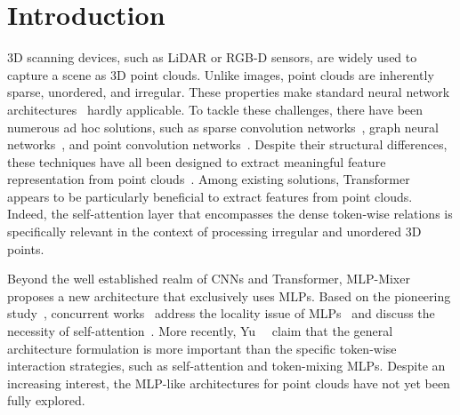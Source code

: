 \section{Introduction}
\label{sec:Introduction}
3D scanning devices, such as LiDAR or RGB-D sensors, are widely used to capture a scene as 3D point clouds. Unlike images, point clouds are inherently sparse, unordered, and irregular. These properties make standard neural network architectures~\cite{resnet,vgg} hardly applicable. To tackle these challenges, there have been numerous ad hoc solutions, such as sparse convolution networks~\cite{mink,spconv}, graph neural networks~\cite{point-graph-00,point-graph-01,point-graph-02,graph-attention,edgeconv,point-graph-03,choe2021volumetric}, and point convolution networks~\cite{interpconv,kpconv,deep-parametric,xu2021paconv}. Despite their structural differences, these techniques have all been designed to extract meaningful feature representation from point clouds~\cite{point-cloud-analysis}. 
Among existing solutions, Transformer~\cite{point-recon,point-cloud-transformer,transformer,point-transformer,park2022fast} appears to be particularly beneficial to extract features from point clouds. Indeed, the self-attention layer that encompasses the dense token-wise relations is specifically relevant in the context of processing irregular and unordered 3D points. 




Beyond the well established realm of CNNs and Transformer, MLP-Mixer~\cite{mlp-mixer} proposes a new architecture that exclusively uses MLPs. Based on the pioneering study~\cite{mlp-mixer}, concurrent works~\cite{cyclemlp,hire-mlp,vision-permutator,convmlp,gmlp,res-mlp,spatial-sift-mlp,spatial-sift-mlp-v2} address the locality issue of MLPs~\cite{cyclemlp,repmlpnet,vision-permutator,as-mlp,spatial-sift-mlp,spatial-sift-mlp-v2} and discuss the necessity of self-attention~\cite{gmlp,synthesizer,morphmlp}. 
More recently, Yu~\etal~\cite{metaformer} claim that the general architecture formulation is more important than the specific token-wise interaction strategies, such as self-attention and token-mixing MLPs.
Despite an increasing interest, the MLP-like architectures for point clouds have not yet been fully explored.









